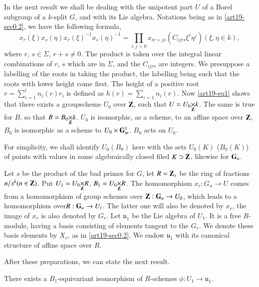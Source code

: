In the next result we shall be dealing with the unipotent part $U$ of a Borel subgroup of a $k$-split $G$, and with its Lie algebra. Notations being as in \ref{art19-sec0.2}, we have the following formula,
\begin{equation}
x_{r}(\xi)x_{s}(\eta)x_{r}(\xi)^{-1}x_{s}(\eta)^{-1}=\prod\limits_{i,j>0}x_{ir+js}(C_{ijrs}\xi^{i}\eta^{j})(\xi,\eta\in k),\label{art19-eq1}
\end{equation}
where $r$, $s\in \Sigma$, $r+s\neq 0$. The product is taken over the integral linear combinations of $r$, $s$ which are in $\Sigma$, and the $C_{ijrs}$ are integers. We presuppose a labelling of the roots in taking the product, the labelling being such that the roots with lower height come first. The height of a positive root $r=\sum\limits^{l}_{i=1}n_{i}(r)r_{i}$ is defined as $h(r)=\sum\limits_{i=1}n_{i}(r)$. Now \eqref{art19-eq1} shows that there exists a groupscheme $U_{0}$ over $\mathbf{Z}$, such that $U=\fprod{U_{0}}{k}{\bfZ}$. The same is true for $B$, so that $B=\fprod{B_{0}}{k}{\bfZ}$. $U_{0}$ is isomorphic, as a scheme, to an affine space over $\mathbf{Z}$, $B_{0}$ is isomorphic as a scheme to $U_{0}\times \mathbf{G}^{1}_{m}$. $B_{0}$ acts on $U_{0}$.

For simplicity, we shall identify $U_{0}(B_{0})$ here with the sets $U_{0}(K)$ ($B_{0}(K)$) of points with values in some algebraically closed filed $K\supset \mathbf{Z}$, likewise for $\mathbf{G}_{a}$.

Let $s$ be the product of the bad primes for $G$, let $R=\mathbf{Z}_{s}$ be the ring of fractions $n/s^{k}(n\in \mathbf{Z})$. Put $U_{1}=\fprod{U_{0}}{R}{\bfZ}$, $B_{1}=\fprod{U_{0}}{R}{\bfZ}$. The homomorphism $x_{r}:G_{a}\to U$ comes from a homomorphism of group schemes over $\mathbf{Z}:\mathbf{G}_{a}\to U_{0}$, which leads to a homomorphism over\pageoriginale $R:\mathbf{G}_{a}\to U_{l}$. The latter one will also be denoted by $x_{r}$, the image of $x_{r}$ is also denoted by $G_{r}$. Let $\mathfrak{u}_{1}$ be the Lie algebra of $U_{1}$. It is a free $R$-module, having a basis consisting of elements tangent to the $G_{r}$. We denote these basis elements by $X_{r}$, as in \ref{art19-sec0.2}. We endow $\mathfrak{u}_{1}$ with its canonical structure of affine space over $R$.

After these preparations, we can state the next result.

\begin{proposition}\label{art19-prop3.5}
There exists a $B_{1}$-equivariant isomorphism of $R$-sche\-mes $\phi:U_{1}\to \mathfrak{u}_{1}$.
\end{proposition}

